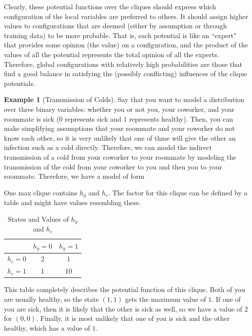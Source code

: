 \documentclass{article}
\theoremstyle{definition}
\newtheorem{example}{Example}[section]
\theoremstyle{remark}
\theoremstyle{definition}
\begin{document}
Clearly, these potential functions over the cliques should express which configuration of the local variables are preferred to others. It should assign higher values to configurations that are deemed (either by assumption or through training data) to be more probable. That is, each potential is like an ``expert" that provides some opinion (the value) on a configuration, and the product of the values of all the potential represents the total opinion of all the experts. Therefore, global configurations with relatively high probabilities are those that find a good balance in satisfying the (possibly conflicting) influences of the clique potentials. 

\begin{example}[Transmission of Colds] 
Say that you want to model a distribution over three binary variables: whether you or not you, your coworker, and your roommate is sick ($0$ represents sick and $1$ represents healthy). Then, you can make simplifying assumptions that your roommate and your coworker do not know each other, so it is very unlikely that one of thme will give the other an infection such as a cold directly. Therefore, we can model the indirect transmission of a cold from your coworker to your roommate by modeling the transmission of the cold from your coworker to you and then you to your roommate. Therefore, we have a model of form

\begin{center}
\end{center}
One max clique contains $h_y$ and $h_c$. The factor for this clique can be defined by a table and might have values resembling these. 
\begin{table}[h]
\centering
\begin{tabular}{c|c|c|}
\cline{2-3}
& \( h_y = 0 \) & \( h_y = 1 \) \\ \hline
\multicolumn{1}{|c|}{\( h_c = 0 \)} & 2 & 1 \\ \hline
\multicolumn{1}{|c|}{\( h_c = 1 \)} & 1 & 10 \\ \hline
\end{tabular}
\caption{States and Values of \( h_y \) and \( h_c \)}
\end{table}
This table completely describes the potential function of this clique. Both of you are usually healthy, so the state $(1, 1)$ gets the maximum value of $1$. If one of you are sick, then it is likely that the other is sick as well, so we have a value of $2$ for $(0, 0)$. Finally, it is most unlikely that one of you is sick and the other healthy, which has a value of $1$. 
\end{example}
\end{document}
